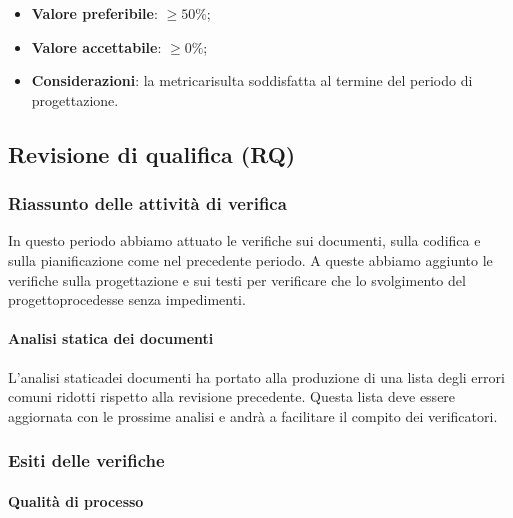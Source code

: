 \begin{itemize}
	\item \textbf{Valore preferibile}: $\ge50\%$;
	\item \textbf{Valore accettabile}: $\ge0\%$;
	\item \textbf{Considerazioni}: la metrica\glosp risulta soddisfatta al termine del periodo di progettazione\glo.
\end{itemize}
\subsection{Revisione di qualifica (RQ)}
\subsubsection{Riassunto delle attività di verifica}
In questo periodo abbiamo attuato le verifiche sui documenti, sulla codifica e sulla pianificazione come nel precedente periodo. A queste abbiamo aggiunto le verifiche sulla progettazione e sui testi per verificare che lo svolgimento del progetto\glosp procedesse senza impedimenti.  
\paragraph{Analisi statica dei documenti}
L'analisi statica\glosp dei documenti ha portato alla produzione di una lista degli errori comuni ridotti rispetto alla revisione precedente. Questa lista deve essere aggiornata con le prossime analisi e andrà a facilitare il compito dei verificatori.
\subsubsection{Esiti delle verifiche} 
\paragraph{Qualità di processo}

